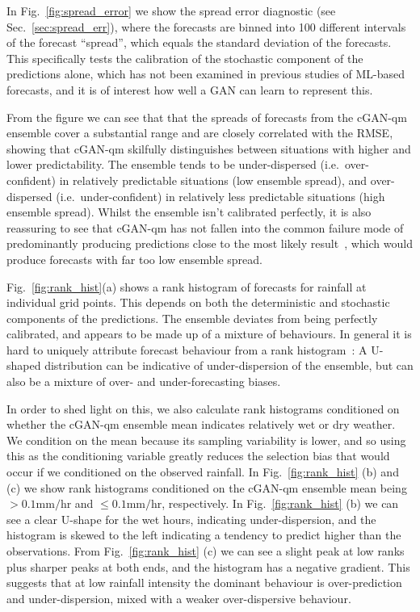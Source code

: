 \documentclass{article}
\begin{document}
In Fig.~\ref{fig:spread_error} we show the spread error diagnostic (see Sec.~\ref{sec:spread_err}), where the forecasts are binned into 100 different intervals of the forecast ``spread'', which equals the standard deviation of the forecasts. This specifically tests the calibration of the stochastic component of the predictions alone, which has not been examined in previous studies of ML-based forecasts, and it is of interest how well a GAN can learn to represent this.

From the figure we can see that that the spreads of forecasts from the cGAN-qm ensemble cover a substantial range and are closely correlated with the RMSE, showing that cGAN-qm skilfully distinguishes between situations with higher and lower predictability. The ensemble tends to be under-dispersed (i.e.~over-confident) in relatively predictable situations (low ensemble spread), and over-dispersed (i.e.~under-confident) in relatively less predictable situations (high ensemble spread). Whilst the ensemble isn't calibrated perfectly, it is also reassuring to see that cGAN-qm has not fallen into the common failure mode of predominantly producing predictions close to the most likely result~\citep{arjovsky_towards_2016}, which would produce forecasts with far too low ensemble spread.

Fig.~\ref{fig:rank_hist}(a) shows a rank histogram of forecasts for rainfall at individual grid points. This depends on both the deterministic and stochastic components of the predictions. The ensemble deviates from being perfectly calibrated, and appears to be made up of a mixture of behaviours. In general it is hard to uniquely attribute forecast behaviour from a rank histogram~\citep{hamill_interpretation_2001}: A U-shaped distribution can be indicative of under-dispersion of the ensemble, but can also be a mixture of over- and under-forecasting biases. 

In order to shed light on this, we also calculate rank histograms conditioned on whether the cGAN-qm ensemble mean indicates relatively wet or dry weather. We condition on the mean because its sampling variability is lower, and so using this as the conditioning variable greatly reduces the selection bias that would occur if we conditioned on the observed rainfall. In Fig.~\ref{fig:rank_hist} (b) and (c) we show rank histograms conditioned on the cGAN-qm ensemble mean being $>0.1\text{mm/hr}$ and $\leq 0.1\text{mm/hr}$, respectively. In Fig.~\ref{fig:rank_hist} (b) we can see a clear U-shape for the wet hours, indicating under-dispersion, and the histogram is skewed to the left indicating a tendency to predict higher than the observations. From Fig.~\ref{fig:rank_hist} (c) we can see a slight peak at low ranks plus sharper peaks at both ends, and the histogram has a negative gradient. This suggests that at low rainfall intensity the dominant behaviour is over-prediction and under-dispersion, mixed with a weaker over-dispersive behaviour.
\end{document}
